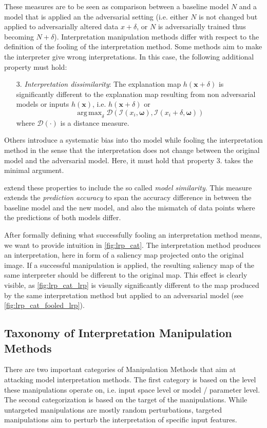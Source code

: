 \documentclass[sigconf]{acmart}
\DeclareMathOperator*{\argmax}{arg\,max}
\begin{document}
These measures are to be seen as comparison between a baseline model $N$ and a model that is applied an the adversarial setting (i.e. either $N$ is not changed but applied to adversarially altered data $x+\delta$, or $N$ is adversarially trained thus becoming $N+\delta$). 
Interpretation manipulation methods differ with respect to the definition of the fooling of the interpretation method. 
Some methods aim to make the interpreter give wrong interpretations\cite{fooling_nn_interpreters}. 
In this case, the following additional property must hold: 
\begin{enumerate}
   \item[3.] \textit{Interpretation dissimilarity}: The explanation map $h(\mathbf{x}+\delta)$ is significantly different to the explanation map resulting from non adversarial models or inputs $h(\mathbf{x})$, i.e. $h(\mathbf{x}+\delta)$ or $$\argmax_{\delta} \mathcal{D}(\mathcal{I}(x_i, \boldsymbol{\omega}), \mathcal{I}(x_i+\delta, \boldsymbol{\omega}))$$ where $\mathcal{D}(\cdot)$ is a distance measure. 
\end{enumerate}

Others introduce a systematic bias into tho model while fooling the interpretation method in the sense that the interpretation does not change between the original model and the adversarial model. 
Here, it must hold that property 3. takes the minimal argument.

\cite{dimanov2020you} extend these properties to include the so called \textit{model similarity}. This measure extends the \textit{prediction accuracy} to span the accuracy difference in between the baseline model and the new model, and also the mismatch of data points where the predictions of both models differ. 

After formally defining what successfully fooling an interpretation method means, we want to provide intuition in \autoref{fig:lrp_cat}. The interpretation method produces an interpretation, here in form of a saliency map projected onto the original image. If a successful manipulation is applied, the resulting saliency map of the same interpreter should be different to the original map. This effect is clearly visible, as \autoref{fig:lrp_cat_lrp} is visually significantly different to the map produced by the same interpretation method but applied to an adversarial model (see \autoref{fig:lrp_cat_fooled_lrp}). 

\subsection{Taxonomy of Interpretation Manipulation Methods}
\label{subsec:taxonomy_manipulations}
There are two important categories of Manipulation Methods that aim at attacking model interpretation methods. The first category is based on the level these manipulations operate on, i.e. input space level or model / parameter level. 
The second categorization is based on the target of the manipulations. While untargeted manipulations are mostly random perturbations, targeted manipulations aim to perturb the interpretation of specific input features. 
\end{document}
